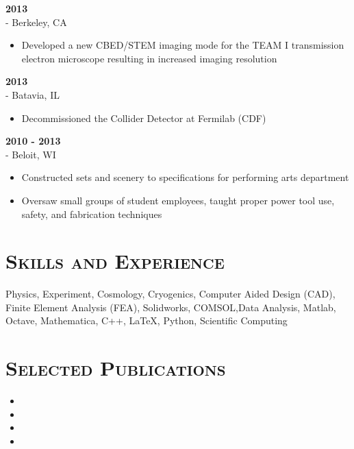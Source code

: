 \documentclass[10pt]{article}
\begin{document}
	 \hspace{\fill} {\bf 2013} \\
	 - Berkeley, CA
	
	\begin{itemize}[noitemsep,topsep=0pt]
		\item{Developed a new CBED/STEM imaging mode for the TEAM I
			transmission electron microscope resulting in increased imaging resolution}
	\end{itemize}
	
	 \hspace{\fill} {\bf 2013} \\
	 - Batavia, IL
	
	\begin{itemize}[noitemsep,topsep=0pt]
		\item{Decommissioned the Collider Detector at Fermilab (CDF)}
	\end{itemize}
	
	 \hspace{\fill} {\bf 2010 - 2013} \\
	 - Beloit, WI
	
	\begin{itemize}[noitemsep,topsep=0pt]
		\item{Constructed sets and scenery to specifications for performing arts department}
		\item{Oversaw small groups of student employees, taught proper power tool use, safety, and
			fabrication techniques}
	\end{itemize}

\section*{\Large{\textsc{Skills and Experience}}}
\vspace*{-1.5em}
\hrulefill

\vspace{0.1in}
\noindent Physics, Experiment, Cosmology, Cryogenics, Computer Aided Design (CAD),  Finite Element Analysis (FEA), Solidworks, \mbox{COMSOL},Data Analysis, Matlab, Octave, Mathematica, C++,
	\LaTeX, Python, Scientific Computing\\
\newpage
\section*{\Large{\textsc{Selected Publications}}}
\vspace*{-1.5em}
\hrulefill

\vspace{0.1in} 
	\begin{itemize}[topsep=0pt]
		\item{}
		\item{}
		\item{}
		\item{}
	\end{itemize}
\end{document}
